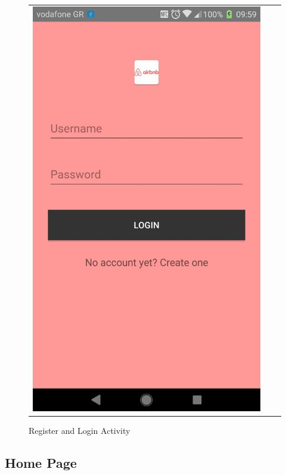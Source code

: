 \documentclass[12pt]{article}
\begin{document}
\begin{center}
\begin{figure}
\begin{tabular}{c c c}
				\includegraphics [scale = 0.18] {04-login.jpg}
				\\
			\end{tabular}
			\caption{Register and Login Activity}
		\end{figure}
	\end{center}
	
	\subsection{Home Page}
	
\end{document}

